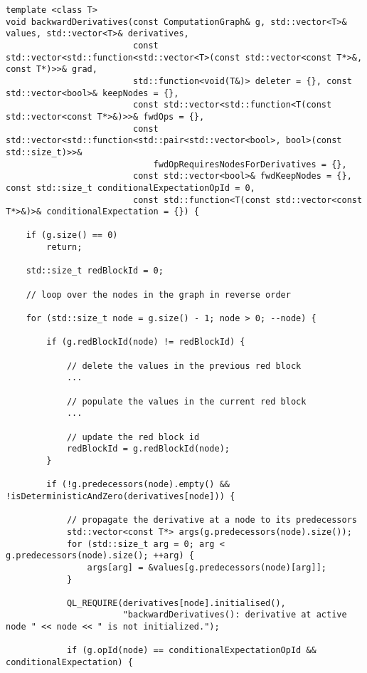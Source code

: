 \begin{listing}
\begin{verbatim}
template <class T>
void backwardDerivatives(const ComputationGraph& g, std::vector<T>& values, std::vector<T>& derivatives,
                         const std::vector<std::function<std::vector<T>(const std::vector<const T*>&, const T*)>>& grad,
                         std::function<void(T&)> deleter = {}, const std::vector<bool>& keepNodes = {},
                         const std::vector<std::function<T(const std::vector<const T*>&)>>& fwdOps = {},
                         const std::vector<std::function<std::pair<std::vector<bool>, bool>(const std::size_t)>>&
                             fwdOpRequiresNodesForDerivatives = {},
                         const std::vector<bool>& fwdKeepNodes = {}, const std::size_t conditionalExpectationOpId = 0,
                         const std::function<T(const std::vector<const T*>&)>& conditionalExpectation = {}) {

    if (g.size() == 0)
        return;

    std::size_t redBlockId = 0;

    // loop over the nodes in the graph in reverse order

    for (std::size_t node = g.size() - 1; node > 0; --node) {

        if (g.redBlockId(node) != redBlockId) {

            // delete the values in the previous red block
            ...

            // populate the values in the current red block
            ...

            // update the red block id
            redBlockId = g.redBlockId(node);
        }

        if (!g.predecessors(node).empty() && !isDeterministicAndZero(derivatives[node])) {

            // propagate the derivative at a node to its predecessors
            std::vector<const T*> args(g.predecessors(node).size());
            for (std::size_t arg = 0; arg < g.predecessors(node).size(); ++arg) {
                args[arg] = &values[g.predecessors(node)[arg]];
            }

            QL_REQUIRE(derivatives[node].initialised(),
                       "backwardDerivatives(): derivative at active node " << node << " is not initialized.");

            if (g.opId(node) == conditionalExpectationOpId && conditionalExpectation) {


\end{verbatim}
\end{listing}

